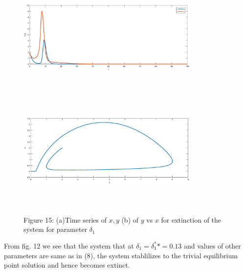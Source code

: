 \documentclass[a4paper, 10pt]{article}
\begin{document}
\begin{figure}[H]
	{\includegraphics[width=9cm, height=6cm]{22a.eps}}
	\endminipage\hfill
	{\includegraphics[width=9cm, height=6cm]{22b.eps}}
	\endminipage\hfill
	\begin{center} Figure 15: (a)Time series of $x,y$  (b)  of $y$ vs $x$ for extinction of the system for parameter $\delta_1$   \end{center}
\end{figure}  
From fig. 12 we see that the system that at $\delta_1=\delta_1^**=0.13$ and values of other parameters are same as in (8), the system stablilizes to the trivial equilibrium point solution and hence becomes extinct.
\end{document}

